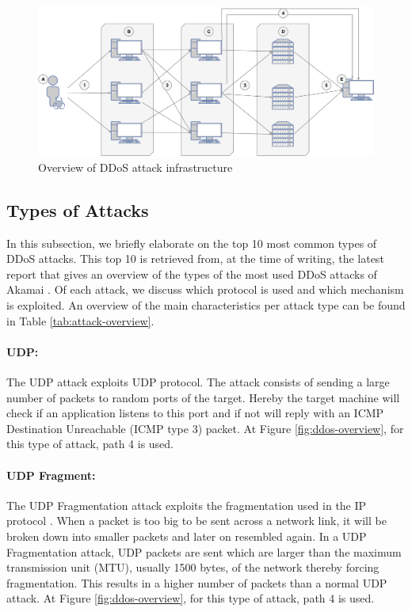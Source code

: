 \begin{figure}[H]
\centering
\includegraphics[width=\textwidth]{./images/ddos-overview.pdf}
\caption{Overview of DDoS attack infrastructure}
\end{figure}\label{fig:ddos-overview}

\subsection{Types of Attacks}\label{subsubsec:types-of-attacks}
In this subsection, we briefly elaborate on the top 10 most common types of DDoS attacks. This top 10 is retrieved from, at the time of writing, the latest report that gives an overview of the types of the most used DDoS attacks of Akamai \cite{Akamai2017-4}. Of each attack, we discuss which protocol is used and which mechanism is exploited. An overview of the main characteristics per attack type can be found in Table \ref{tab:attack-overview}.


\paragraph{UDP:}
The UDP attack exploits UDP protocol. The attack consists of sending a large number of packets to random ports of the target. Hereby the target machine will check if an application listens to this port and if not will reply with an ICMP Destination Unreachable (ICMP type 3) packet. At Figure \ref{fig:ddos-overview}, for this type of attack, path 4 is used.

\paragraph{UDP Fragment:}
The UDP Fragmentation attack exploits the fragmentation used in the IP protocol \cite{imperva}. When a packet is too big to be sent across a network link, it will be broken down into smaller packets and later on resembled again. In a UDP Fragmentation attack, UDP packets are sent which are larger than the maximum transmission unit (MTU), usually 1500 bytes, of the network thereby forcing fragmentation. This results in a higher number of packets than a normal UDP attack. At Figure \ref{fig:ddos-overview}, for this type of attack, path 4 is used.

